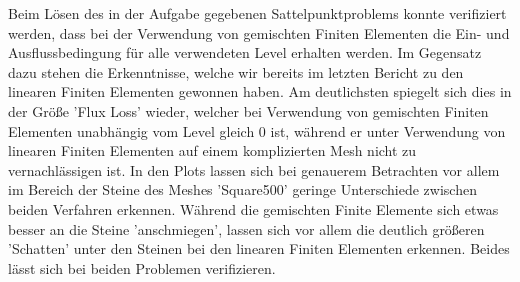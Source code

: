 \begin{figure}[H]
	\centering

\end{figure}

Beim Lösen des in der Aufgabe gegebenen Sattelpunktproblems konnte verifiziert werden, dass bei der Verwendung von gemischten Finiten Elementen die Ein- und Ausflussbedingung für alle verwendeten Level erhalten werden.
Im Gegensatz dazu stehen die Erkenntnisse, welche wir bereits im letzten Bericht zu den linearen Finiten Elementen gewonnen haben. 
Am deutlichsten spiegelt sich dies in der Größe 'Flux Loss' wieder, welcher bei Verwendung von gemischten Finiten Elementen unabhängig vom Level gleich 0 ist, während er unter Verwendung von linearen Finiten Elementen auf einem komplizierten Mesh nicht zu vernachlässigen ist.  \newline
In den Plots lassen sich bei genauerem Betrachten vor allem im Bereich der Steine des Meshes 'Square500' geringe Unterschiede zwischen beiden Verfahren erkennen. Während die gemischten Finite Elemente sich etwas besser an die Steine 'anschmiegen', lassen sich vor allem die deutlich größeren 'Schatten' unter den Steinen bei den linearen Finiten Elementen erkennen.
Beides lässt sich bei beiden Problemen verifizieren. 


